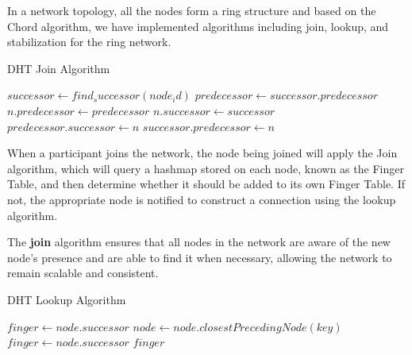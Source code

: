 \documentclass[twocolumn]{article}
\begin{document}
In a network topology, all the nodes form a ring structure and based on the Chord algorithm, we have implemented algorithms including join, lookup, and stabilization for the ring network.
\begin{algorithm}
\caption{DHT Join Algorithm}
\label{alg:join}
\begin{algorithmic}[1]
\State $successor\gets find_successor(node_id)$
\State $predecessor\gets successor.predecessor$
\State $n.predecessor\gets predecessor$
\State $n.successor\gets successor$
\State $predecessor.successor\gets n$
\State $successor.predecessor\gets n$
\EndFunction
\end{algorithmic}
\end{algorithm}

When a participant joins the network, the node being joined will apply the Join algorithm, which will query a hashmap stored on each node, known as the Finger Table, and then determine whether it should be added to its own Finger Table. If not, the appropriate node is notified to construct a connection using the lookup algorithm.

The \textbf{join} algorithm ensures that all nodes in the network are aware of the new node's presence and are able to find it when necessary, allowing the network to remain scalable and consistent.

\begin{algorithm}[h]
\caption{DHT Lookup Algorithm}
\label{alg:lookup}
\begin{algorithmic}[1]
    \State $finger\gets node.successor$
        \State $node\gets node.closestPrecedingNode(key)$
        \State $finger\gets node.successor$
    \EndWhile
    \State \Return $finger$
\EndFunction
\end{algorithmic}
\end{algorithm}
\end{document}
